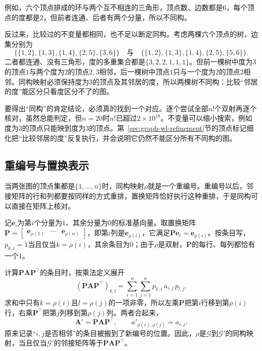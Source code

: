 例如，六个顶点排成的环与两个互不相连的三角形，顶点数、边数都是$6$，每个顶点的度都是$2$，但前者连通、后者有两个分量，所以不同构。

反过来，比较过的不变量都相同，也不足以断定同构。考虑两棵六个顶点的树，边集分别为
\[
\bigl\{\{1,2\},\{1,3\},\{1,4\},\{2,5\},\{3,6\}\bigr\}
\quad\text{与}\quad
\bigl\{\{1,2\},\{1,3\},\{1,4\},\{2,5\},\{5,6\}\bigr\}.
\]
二者都连通、没有三角形，度的多重集合都是$\{3,2,2,1,1,1\}$。但前一棵树中度为$3$的顶点$1$与两个度为$2$的顶点$2,3$相邻，后一棵树中顶点$1$只与一个度为$2$的顶点$2$相邻。同构映射必须保持度为$3$的顶点及其邻居的度，所以两棵树不同构：比较“邻居的度”能区分只看度区分不了的图。

要得出“同构”的肯定结论，必须真的找到一个对应。逐个尝试全部$n!$个双射再逐个核对，虽然总能判定，但$n=20$时$n!$已超过$2\times10^{18}$。不变量可以缩小搜索，例如度为$3$的顶点只能映到度为$3$的顶点。第~\ref{sec:graph-wl-refinement}节的顶点标记细化把“比较邻居的度”反复执行，并会说明它仍然不能区分所有不同构的图。

\subsection{重编号与置换表示}
\label{sec:graph-conn-relabeling}

当两张图的顶点集都是$\{1,\ldots,n\}$时，同构映射$\rho$就是一个重编号。重编号以后，邻接矩阵的行和列都要按同样的方式重排，置换矩阵恰好执行这种重排，于是同构可以直接在矩阵上核对。

记$\bm e_i$为第$i$个分量为$1$、其余分量为$0$的标准基向量。取置换矩阵$\bm P=\begin{bmatrix}\bm e_{\rho(1)}&\cdots&\bm e_{\rho(n)}\end{bmatrix}$，即第$i$列是$\bm e_{\rho(i)}$，它满足$\bm P\bm e_i=\bm e_{\rho(i)}$。按条目写，$p_{k,i}=1$当且仅当$k=\rho(i)$，其余条目为$0$；由于$\rho$是双射，$\bm P$的每行、每列都恰有一个$1$。

计算$\bm P\bm A\bm P^{\top}$的条目时，按乘法定义展开
\[
(\bm P\bm A\bm P^{\top})_{k,l}=\sum_{i=1}^{n}\sum_{j=1}^{n}p_{k,i}\,a_{i,j}\,p_{l,j}.
\]
求和中只有$k=\rho(i)$且$l=\rho(j)$的一项非零，所以左乘$\bm P$把第$i$行移到第$\rho(i)$行，右乘$\bm P^{\top}$把第$j$列移到第$\rho(j)$列。两者合起来，
\begin{equation}
\bm A'=\bm P\bm A\bm P^{\top},\qquad
a'_{\rho(i),\rho(j)}=a_{i,j}.
\label{eq:graph-conn-relabel}
\end{equation}
原来记录“$i,j$是否相邻”的条目被搬到了新编号的位置。因此，$\rho$是$\mathcal G$到$\mathcal G'$的同构映射，当且仅当$\mathcal G'$的邻接矩阵等于$\bm P\bm A\bm P^{\top}$。

